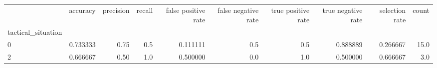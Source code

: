 \begin{tabular}{lrrrrrrrrr}
\toprule
{} &  accuracy &  precision &  recall &  false positive rate &  false negative rate &  true positive rate &  true negative rate &  selection rate &  count \\
tactical\_situation &           &            &         &                      &                      &                     &                     &                 &        \\
\midrule
0                  &  0.733333 &       0.75 &     0.5 &             0.111111 &                  0.5 &                 0.5 &            0.888889 &        0.266667 &   15.0 \\
2                  &  0.666667 &       0.50 &     1.0 &             0.500000 &                  0.0 &                 1.0 &            0.500000 &        0.666667 &    3.0 \\
\bottomrule
\end{tabular}
